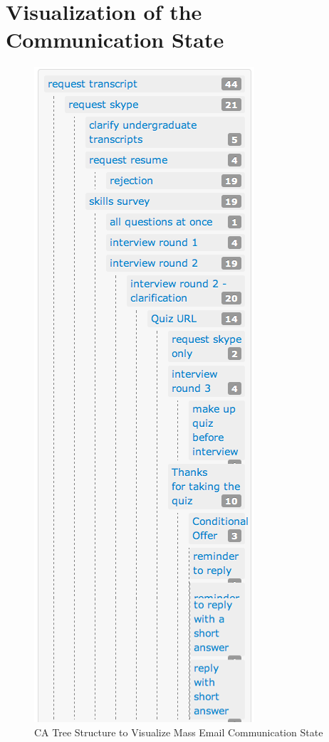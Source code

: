 \chapter{Visualization of the Communication State}
\label{app:VisuCommStat}


\begin{figure}[htbp]
	\centering
	\includegraphics[scale=0.55]{imgs/VisualizationOfCommunicationState.png}
	\caption[A Tree Structure to Visualize Mass Email Communication State]{CA Tree Structure to Visualize Mass Email Communication State}
	\label{fig:VisualizationOfCommunicationState}
\end{figure}